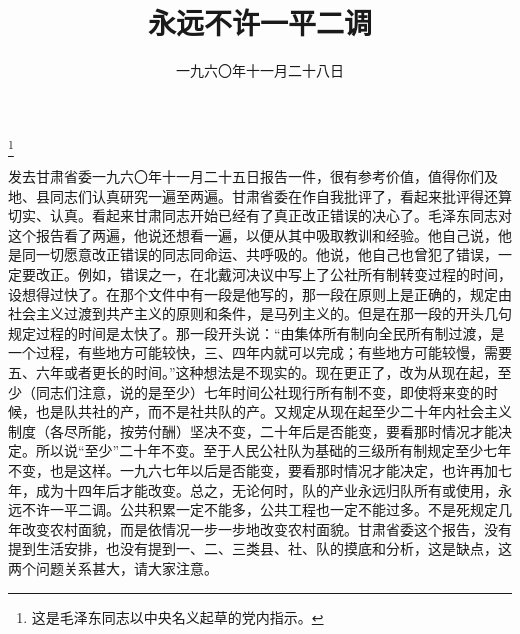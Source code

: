 
\title{永远不许一平二调}
\date{一九六〇年十一月二十八日}
\thanks{这是毛泽东同志以中央名义起草的党内指示。}
\maketitle



发去甘肃省委一九六〇年十一月二十五日报告一件，很有参考价值，值得你们及地、县同志们认真研究一遍至两遍。甘肃省委在作自我批评了，看起来批评得还算切实、认真。看起来甘肃同志开始已经有了真正改正错误的决心了。毛泽东同志对这个报告看了两遍，他说还想看一遍，以便从其中吸取教训和经验。他自己说，他是同一切愿意改正错误的同志同命运、共呼吸的。他说，他自己也曾犯了错误，一定要改正。例如，错误之一，在北戴河决议中写上了公社所有制转变过程的时间，设想得过快了。在那个文件中有一段是他写的，那一段在原则上是正确的，规定由社会主义过渡到共产主义的原则和条件，是马列主义的。但是在那一段的开头几句规定过程的时间是太快了。那一段开头说：“由集体所有制向全民所有制过渡，是一个过程，有些地方可能较快，三、四年内就可以完成；有些地方可能较慢，需要五、六年或者更长的时间。”这种想法是不现实的。现在更正了，改为从现在起，至少（同志们注意，说的是至少）七年时间公社现行所有制不变，即使将来变的时候，也是队共社的产，而不是社共队的产。又规定从现在起至少二十年内社会主义制度（各尽所能，按劳付酬）坚决不变，二十年后是否能变，要看那时情况才能决定。所以说“至少”二十年不变。至于人民公社队为基础的三级所有制规定至少七年不变，也是这样。一九六七年以后是否能变，要看那时情况才能决定，也许再加七年，成为十四年后才能改变。总之，无论何时，队的产业永远归队所有或使用，永远不许一平二调。公共积累一定不能多，公共工程也一定不能过多。不是死规定几年改变农村面貌，而是依情况一步一步地改变农村面貌。甘肃省委这个报告，没有提到生活安排，也没有提到一、二、三类县、社、队的摸底和分析，这是缺点，这两个问题关系甚大，请大家注意。

